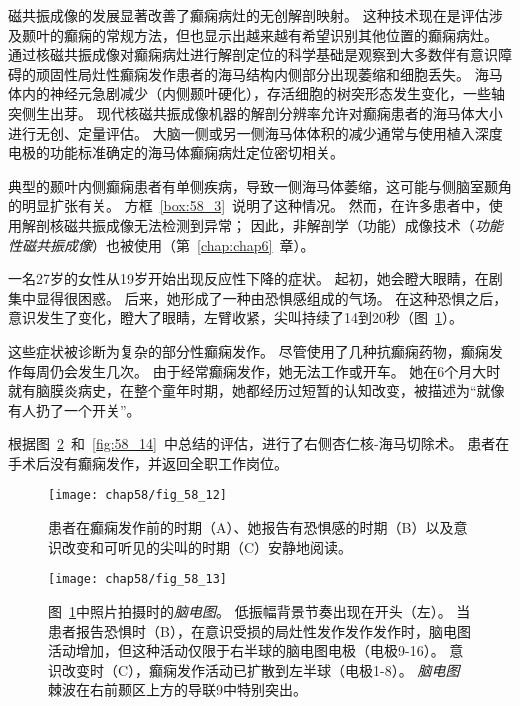 磁共振成像的发展显著改善了癫痫病灶的无创解剖映射。
这种技术现在是评估涉及颞叶的癫痫的常规方法，但也显示出越来越有希望识别其他位置的癫痫病灶。
通过核磁共振成像对癫痫病灶进行解剖定位的科学基础是观察到大多数伴有意识障碍的顽固性局灶性癫痫发作患者的海马结构内侧部分出现萎缩和细胞丢失。
海马体内的神经元急剧减少（内侧颞叶硬化），存活细胞的树突形态发生变化，一些轴突侧生出芽。
现代核磁共振成像机器的解剖分辨率允许对癫痫患者的海马体大小进行无创、定量评估。
大脑一侧或另一侧海马体体积的减少通常与使用植入深度电极的功能标准确定的海马体癫痫病灶定位密切相关。


典型的颞叶内侧癫痫患者有单侧疾病，导致一侧海马体萎缩，这可能与侧脑室颞角的明显扩张有关。
方框~\ref{box:58_3}~说明了这种情况。
然而，在许多患者中，使用解剖核磁共振成像无法检测到异常；
因此，非解剖学（功能）成像技术（\textit{功能性磁共振成像}）也被使用（第~\ref{chap:chap6}~章）。


\begin{proposition}[神经解剖学导航术语] \label{box:58_3}
	
	\quad \quad 一名27岁的女性从19岁开始出现反应性下降的症状。
	起初，她会瞪大眼睛，在剧集中显得很困惑。
	后来，她形成了一种由恐惧感组成的气场。
	在这种恐惧之后，意识发生了变化，瞪大了眼睛，左臂收紧，尖叫持续了14到20秒（图~\ref{fig:58_12}）。
	
	\quad \quad 这些症状被诊断为复杂的部分性癫痫发作。
	尽管使用了几种抗癫痫药物，癫痫发作每周仍会发生几次。
	由于经常癫痫发作，她无法工作或开车。
	她在6个月大时就有脑膜炎病史，在整个童年时期，她都经历过短暂的认知改变，被描述为“就像有人扔了一个开关”。
	
	\quad \quad 根据图~\ref{fig:58_13}~和~\ref{fig:58_14}~中总结的评估，进行了右侧杏仁核-海马切除术。
	患者在手术后没有癫痫发作，并返回全职工作岗位。
	
\end{proposition}


\begin{figure}[htbp]
	\centering
	\texttt{[image: chap58/fig\_58\_12]}
	\caption{患者在癫痫发作前的时期（A）、她报告有恐惧感的时期（B）以及意识改变和可听见的尖叫的时期（C）安静地阅读。}
	\label{fig:58_12}
\end{figure}


\begin{figure}[htbp]
	\centering
	\texttt{[image: chap58/fig\_58\_13]}
	\caption{图~\ref{fig:58_12}中照片拍摄时的\textit{脑电图}。
		低振幅背景节奏出现在开头（左）。
		当患者报告恐惧时（B），在意识受损的局灶性发作发作发作时，脑电图活动增加，但这种活动仅限于右半球的脑电图电极（电极9-16）。
		意识改变时（C），癫痫发作活动已扩散到左半球（电极1-8）。
		\textit{脑电图}棘波在右前颞区上方的导联9中特别突出。}
	\label{fig:58_13}
\end{figure}


